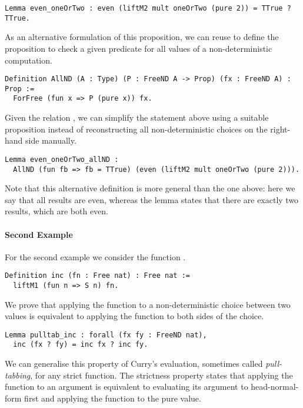 \begin{verbatim}
Lemma even_oneOrTwo : even (liftM2 mult oneOrTwo (pure 2)) = TTrue ? TTrue.
\end{verbatim}

As an alternative formulation of this proposition, we can reuse  to define the proposition  to check a given predicate for all values of a non-deterministic computation.

\begin{verbatim}
Definition AllND (A : Type) (P : FreeND A -> Prop) (fx : FreeND A) : Prop :=
  ForFree (fun x => P (pure x)) fx.
\end{verbatim}

Given the relation , we can simplify the statement above using a suitable proposition instead of reconstructing all non-deterministic choices on the right-hand side manually.

\begin{verbatim}
Lemma even_oneOrTwo_allND :
  AllND (fun fb => fb = TTrue) (even (liftM2 mult oneOrTwo (pure 2))).
\end{verbatim}

Note that this alternative definition is more general than the one above: here we say that all results are even, whereas the lemma  states that there are exactly two results, which are both even.

\paragraph{Second Example}
For the second example we consider the function .

\begin{verbatim}
Definition inc (fn : Free nat) : Free nat :=
  liftM1 (fun n => S n) fn.
\end{verbatim}

We prove that applying the function  to a non-deterministic choice between two values is equivalent to applying the function to both sides of the choice.

\begin{verbatim}
Lemma pulltab_inc : forall (fx fy : FreeND nat),
  inc (fx ? fy) = inc fx ? inc fy.
\end{verbatim}

We can generalise this property of Curry's evaluation, sometimes called \emph{pull-tabbing}, for any strict function.
The strictness property states that applying the function to an argument is equivalent to evaluating its argument to head-normal-form first and applying the function to the pure value.

